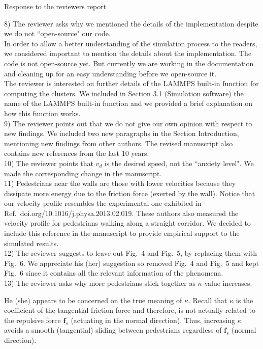 \documentclass[a4paper,12pt]{letter}
\begin{document}
\begin{letter}{Response to the reviewers report}
{8) The reviewer asks why we mentioned the details of the implementation despite 
we do not ``open-source" our code. \\

In order to allow a better understanding of the simulation process to the readers, we 
considered important to mention the details about the implementation. The code is not open-source yet.
But currently we are working in the documentation and cleaning up for an easy understanding before we open-source it. \\

The reviewer is interested on further details of the LAMMPS built-in function for 
computing the clusters. We included in Section 3.1 (Simulation software) the name of the LAMMPS 
built-in function and we provided a brief explanation on how this function works. \\ 

9) The reviewer points out that we do not give our own opinion with respect
to new findings. We included two new paragraphs in the Section Introduction, 
mentioning new findings from other authors. The revised manuscript also contains new references from the last 10 years.\\


10) The reviewer points that $v_d$ is the desired speed, not the ``anxiety level". 
We made the corresponding change in the manuscript.\\

11) Pedestrians near the walls are those with lower velocities because they 
dissipate more energy due to the friction force (exerted by the wall).
Notice that our velocity profile resembles the experimental one
exhibited in  Ref.~doi.org/10.1016/j.physa.2013.02.019.
These authors also measured the velocity profile for
pedestrians walking along a straight corridor. We decided to
include this reference in the manuscript to provide empirical 
support to the simulated results. \\

12) The reviewer suggests to leave out Fig.~4 and Fig.~5, by replacing them with Fig.~6. 
We appreciate his (her) suggestion so removed Fig.~4 and Fig.~5 and kept Fig.~6 since it
contains all the relevant information of the phenomena. \\

13) The reviewer asks why more pedestrians stick together as $\kappa$-value increases. 

He (she) appears to be concerned on the true meaning of $\kappa$. 
Recall that $\kappa$ is the coefficient of the tangential friction force and therefore,
is not actually related to the repulsive force $\mathbf{f}_s$ (actuating in the normal direction). 
Thus, increasing $\kappa$ avoids a smooth (tangential) sliding between pedestrians
regardless of $\mathbf{f}_s$ (normal direction). \\

}
\end{letter}
\end{document}
